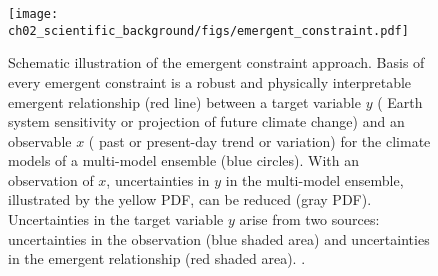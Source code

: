 \begin{figure}[t]
  \centering
  \texttt{[image: 
    ch02\_scientific\_background/figs/emergent\_constraint.pdf]}
  \caption[
    Schematic illustration of the emergent constraint approach.
  ]{
    Schematic illustration of the emergent constraint approach. Basis of every
    emergent constraint is a robust and physically interpretable emergent
    relationship (red line) between a target variable $y$ (\eg{} Earth system
    sensitivity or projection of future climate change) and an observable $x$
    (\eg{} past or present-day trend or variation) for the climate models of a
    multi-model ensemble (blue circles). With an observation of $x$,
    uncertainties in $y$ in the multi-model ensemble, illustrated by the yellow
    \acf{PDF}, can be reduced (gray \acs{PDF}). Uncertainties in the target
    variable $y$ arise from two sources: uncertainties in the observation (blue
    shaded area) and uncertainties in the emergent relationship (red shaded
    area). .
  }
  \label{fig:02:emergent_constraint}
\end{figure}

